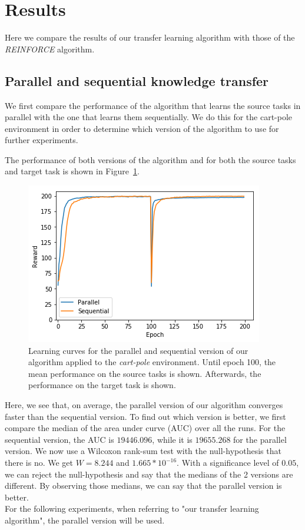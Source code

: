 \section{Results}
Here we compare the results of our transfer learning algorithm with those of the \textit{REINFORCE} algorithm.

\subsection{Parallel and sequential knowledge transfer} %
\label{sub:parallel_and_sequential_knowledge_transfer}
We first compare the performance of the algorithm that learns the source tasks in parallel with the one that learns them sequentially. We do this for the cart-pole environment in order to determine which version of the algorithm to use for further experiments.

The performance of both versions of the algorithm and for both the source tasks and target task is shown in Figure~\ref{fig:CartPole:reward_akt-kt_all_5tasks}.
\begin{figure}[htb]
    \centering
    \includegraphics[width=.8\linewidth]{images/results/CartPole/kt_akt/reward_source-target_5tasks.png}
    \caption[Learning curves for the parallel and sequential version of our algorithm applied to the \textit{cart-pole} environment]{Learning curves for the parallel and sequential version of our algorithm applied to the \textit{cart-pole} environment. Until epoch 100, the mean performance on the source tasks is shown. Afterwards, the performance on the target task is shown.}
    \label{fig:CartPole:reward_akt-kt_all_5tasks}
\end{figure}
Here, we see that, on average, the parallel version of our algorithm converges faster than the sequential version.
To find out which version is better, we first compare the median of the area under curve (AUC) over all the runs.
For the sequential version, the AUC is $19446.096$, while it is $19655.268$ for the parallel version.
We now use a Wilcoxon rank-sum test with the null-hypothesis that there is no.
We get $W=8.244$ and $1.665*10^{-16}$.
With a significance level of $0.05$, we can reject the null-hypothesis and say that the medians of the 2 versions are different.
By observing those medians, we can say that the parallel version is better.\\
For the following experiments, when referring to "our transfer learning algorithm", the parallel version will be used.

